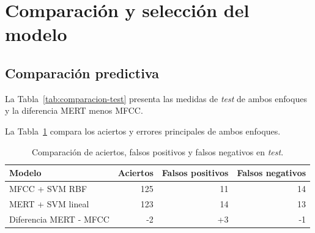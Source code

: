 \section{Comparación y selección del modelo}

\subsection*{Comparación predictiva}

La Tabla~\ref{tab:comparacion-test} presenta las medidas de \textit{test} de ambos enfoques y la diferencia MERT menos MFCC.

\begin{table}[H]
    \centering
    \caption{Comparación predictiva en \textit{test}.}
    \label{tab:comparacion-test}
\end{table}

La Tabla~\ref{tab:comparacion-errores} compara los aciertos y errores principales de ambos enfoques.

\begin{table}[H]
    \centering
    \begin{tabular}{lrrr}
        \hline
        \textbf{Modelo} & \textbf{Aciertos} & \textbf{Falsos positivos} & \textbf{Falsos negativos} \\
        \hline
        MFCC + SVM RBF & 125 & 11 & 14 \\
        MERT + SVM lineal & 123 & 14 & 13 \\
        Diferencia MERT - MFCC & -2 & +3 & -1 \\
        \hline
    \end{tabular}
    \caption{Comparación de aciertos, falsos positivos y falsos negativos en \textit{test}.}
    \label{tab:comparacion-errores}
\end{table}

